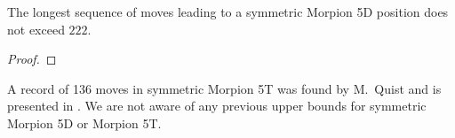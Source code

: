 {\begin{corollary}
\label{cor:222}
The longest sequence of moves leading to a symmetric Morpion 5D position does not exceed $222$.
\end{corollary}
\begin{proof} 

\end{proof}

\begin{remark}
A record of 136 moves in symmetric Morpion 5T was found by M.~Quist and is presented in \cite{boyer}. We are not aware of any previous upper bounds for symmetric Morpion 5D or Morpion 5T.
\end{remark}
}
